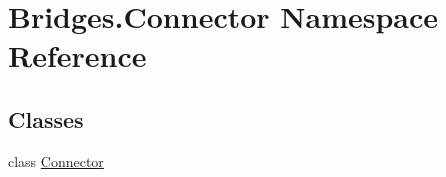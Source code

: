 \hypertarget{namespace_bridges_1_1_connector}{}\section{Bridges.\+Connector Namespace Reference}
\label{namespace_bridges_1_1_connector}
\subsection*{Classes}
\begin{DoxyCompactItemize}
\item 
class \mbox{\hyperlink{class_bridges_1_1_connector_1_1_connector}{Connector}}
\end{DoxyCompactItemize}
